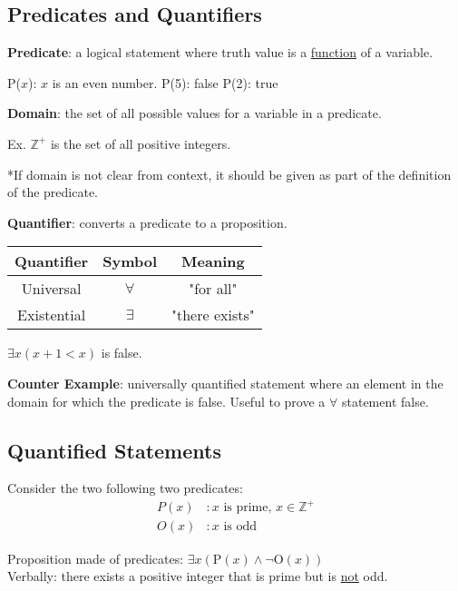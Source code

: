 \documentclass{article}
\begin{document}
\subsection{Predicates and Quantifiers}

\textbf{Predicate}: a logical statement where truth value is a \underline{function} of a variable.

\begin{center}
  P(\(x\)): \(x\) is an even number. \qquad P(5): false \qquad P(2): true
\end{center}

\noindent \textbf{Domain}: the set of all possible values for a variable in a predicate.

\begin{center}
  Ex. \( \mathbb{Z}^+ \) is the set of all positive integers.

  *If domain is not clear from context, it should be given as part of the definition of the predicate.
\end{center}

\noindent \textbf{Quantifier}: converts a predicate to a proposition.
\qquad
\begin{tabular}{c|c|c}
  Quantifier  & Symbol       & Meaning        \\
  \hline
  Universal   & \(\forall \) & "for all"      \\
  Existential & \(\exists\)  & "there exists" \\
\end{tabular}

\begin{center}
  \(\exists x (x+1 < x)\) is false.
\end{center}

\noindent \textbf{Counter Example}: universally quantified statement where an element in the domain
for which the predicate is false. Useful to prove a \(\forall\) statement false.

\subsection{Quantified Statements}

Consider the two following two predicates:
\begin{align*}
  P(x) & : x \text{ is prime, } x \in \mathbb{Z}^+ \\
  O(x) & : x \text{ is odd}
\end{align*}

\begin{center}
  Proposition made of predicates: \qquad \(\exists x (\text{P}(x) \land \lnot \text{O}(x))\) \\
  Verbally: there exists a positive integer that is prime but is \underline{not} odd.
\end{center}
\end{document}
